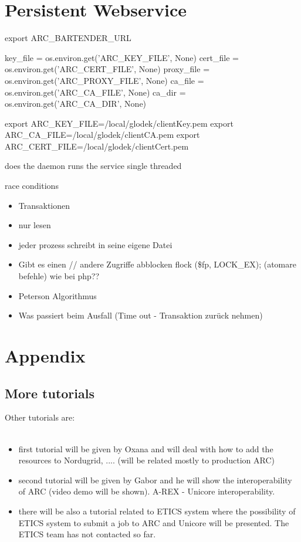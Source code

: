  
\chapter{Persistent Webservice}


export ARC\_BARTENDER\_URL


    key\_file = os.environ.get('ARC\_KEY\_FILE', None)
    cert\_file = os.environ.get('ARC\_CERT\_FILE', None)
    proxy\_file = os.environ.get('ARC\_PROXY\_FILE', None)
    ca\_file = os.environ.get('ARC\_CA\_FILE', None)
    ca\_dir = os.environ.get('ARC\_CA\_DIR', None)

export ARC\_KEY\_FILE=/local/glodek/clientKey.pem
export ARC\_CA\_FILE=/local/glodek/clientCA.pem
export ARC\_CERT\_FILE=/local/glodek/clientCert.pem

does the daemon runs the service single threaded

race conditions
\begin{itemize}
 \item Transaktionen
 \item nur lesen
 \item jeder prozess schreibt in seine eigene Datei
 \item Gibt es einen     // andere Zugriffe abblocken
    flock (\$fp, LOCK\_EX);  (atomare befehle)
 	wie bei php??
 \item Peterson Algorithmus
 \item Was passiert beim Ausfall (Time out - Transaktion zurück nehmen)
\end{itemize}


\chapter{Appendix}

\section{More tutorials}

Other tutorials are:\\
\\
\begin{itemize}
 \item first tutorial will be given by Oxana and will deal with how to add the 
resources to Nordugrid, .... (will be related mostly to production ARC)
 \item second tutorial will be given by Gabor and he will show the 
interoperability of ARC (video demo will be shown). A-REX - Unicore 
interoperability.
 \item there will be also a tutorial related to ETICS system where the 
possibility of ETICS system to submit a job to ARC and Unicore will be 
presented. The ETICS team has not contacted so far.
\end{itemize}


